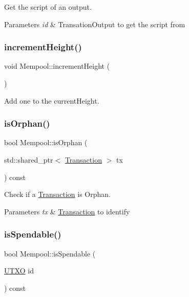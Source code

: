 Get the script of an output. 


\begin{DoxyParams}{Parameters}
{\em id} & Transation\+Output to get the script from \\
\hline
\end{DoxyParams}
\mbox{\label{classMempool_ad6bb7b0310265f592a29ff9a06656333}} 
\subsubsection{\texorpdfstring{increment\+Height()}{incrementHeight()}}
{\footnotesize\ttfamily void Mempool\+::increment\+Height (\begin{DoxyParamCaption}{ }\end{DoxyParamCaption})}



Add one to the current\+Height. 

\mbox{\label{classMempool_a6ccb56de239266bd5cebafac3112b31e}} 
\subsubsection{\texorpdfstring{is\+Orphan()}{isOrphan()}}
{\footnotesize\ttfamily bool Mempool\+::is\+Orphan (\begin{DoxyParamCaption}\item[{std\+::shared\+\_\+ptr$<$ \mbox{\hyperlink{classTransaction}{Transaction}} $>$}]{tx }\end{DoxyParamCaption}) const}



Check if a \mbox{\hyperlink{classTransaction}{Transaction}} is Orphan. 


\begin{DoxyParams}{Parameters}
{\em tx} & \mbox{\hyperlink{classTransaction}{Transaction}} to identify \\
\hline
\end{DoxyParams}
\mbox{\label{classMempool_a6ac1288e72c47a9c63841696901d7f3c}} 
\subsubsection{\texorpdfstring{is\+Spendable()}{isSpendable()}}
{\footnotesize\ttfamily bool Mempool\+::is\+Spendable (\begin{DoxyParamCaption}\item[{\mbox{\hyperlink{utxo_8hpp_a19091d002da03ec92277e19295ac4540}{U\+T\+XO}}}]{id }\end{DoxyParamCaption}) const}



